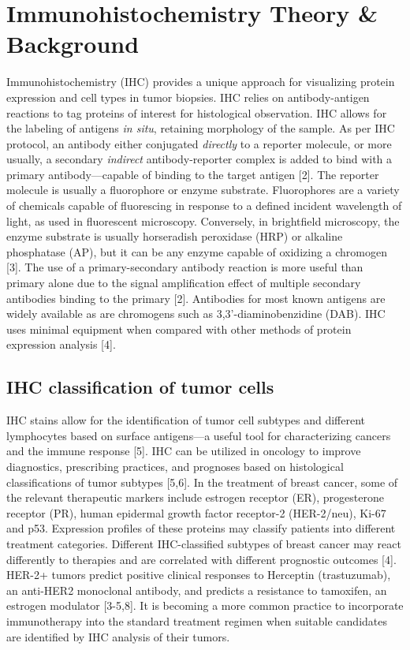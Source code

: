 \documentclass[12pt]{article}
\begin{document}
\section*{Immunohistochemistry Theory \& Background}

Immunohistochemistry (IHC) provides a unique approach for visualizing protein expression and cell types in tumor biopsies. IHC relies on antibody-antigen reactions to tag proteins of interest for histological observation. IHC allows for the labeling of antigens \textit{in situ}, retaining morphology of the sample. As per IHC protocol, an antibody either conjugated \textit{directly} to a reporter molecule, or more usually, a secondary \textit{indirect} antibody-reporter complex is added to bind with a primary antibody---capable of binding to the target antigen [2]. The reporter molecule is usually a fluorophore or enzyme substrate. Fluorophores are a variety of chemicals capable of fluorescing in response to a defined incident wavelength of light, as used in fluorescent microscopy. Conversely, in brightfield microscopy, the enzyme substrate is usually horseradish peroxidase (HRP) or alkaline phosphatase (AP), but it can be any enzyme capable of oxidizing a chromogen [3]. The use of a primary-secondary antibody reaction is more useful than primary alone due to the signal amplification effect of multiple secondary antibodies binding to the primary [2]. Antibodies for most known antigens are widely available as are chromogens such as 3,3'-diaminobenzidine (DAB). IHC uses minimal equipment when compared with other methods of protein expression analysis [4]. 


\subsection*{IHC classification of tumor cells}

IHC stains allow for the identification of tumor cell subtypes and different lymphocytes based on surface antigens---a useful tool for characterizing cancers and the immune response [5]. IHC can be utilized in oncology to improve diagnostics, prescribing practices, and prognoses based on histological classifications of tumor subtypes [5,6]. In the treatment of breast cancer, some of the relevant therapeutic markers include estrogen receptor (ER), progesterone receptor (PR), human epidermal growth factor receptor-2 (HER-2/neu), Ki-67 and p53. Expression profiles of these proteins may classify patients into different treatment categories. Different IHC-classified subtypes of breast cancer may react differently to therapies and are correlated with different prognostic outcomes [4]. HER-2+ tumors predict positive clinical responses to Herceptin (trastuzumab), an anti-HER2 monoclonal antibody, and predicts a resistance to tamoxifen, an estrogen modulator [3-5,8]. It is becoming a more common practice to incorporate immunotherapy into the standard treatment regimen when suitable candidates are identified by IHC analysis of their tumors. 
\end{document}
